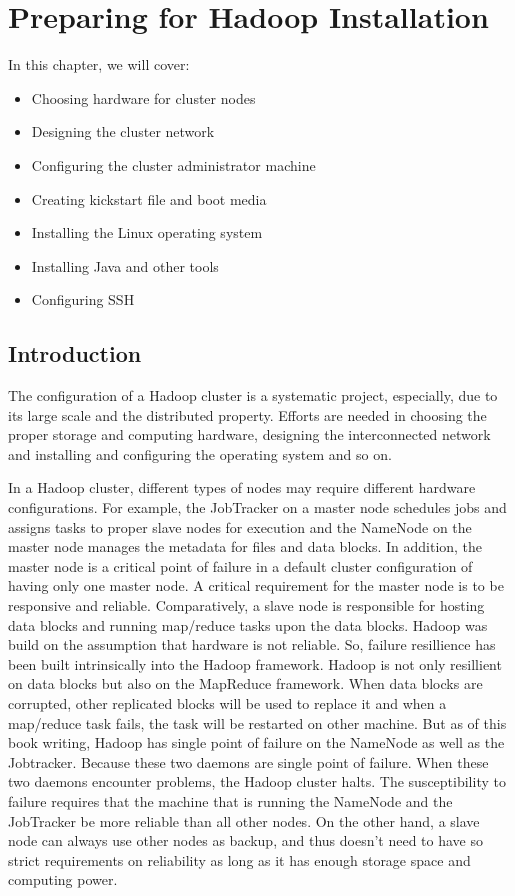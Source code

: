 \chapter{Preparing for Hadoop Installation}\label{chap:2}
In this chapter, we will cover:
\begin{itemize}
  \item Choosing hardware for cluster nodes
  \item Designing the cluster network
  \item Configuring the cluster administrator machine
  \item Creating kickstart file and boot media
  \item Installing the Linux operating system
  \item Installing Java and other tools
  \item Configuring SSH
\end{itemize}
\section{Introduction}
The configuration of a Hadoop cluster is a systematic project, especially, due to its large scale and the distributed property. Efforts are needed in choosing the proper storage and computing hardware, designing the interconnected network and installing and configuring the operating system and so on.

In a Hadoop cluster, different types of nodes may require different hardware configurations. For example, the JobTracker on a master node schedules jobs and assigns tasks to proper slave nodes for execution and the NameNode on the master node manages the metadata for files and data blocks. In addition, the master node is a critical point of failure in a default cluster configuration of having only one master node. A critical requirement for the master node is to be responsive and reliable. Comparatively, a slave node is responsible for hosting data blocks and running map/reduce tasks upon the data blocks. Hadoop was build on the assumption that hardware is not reliable. So, failure resillience has been built intrinsically into the Hadoop framework. Hadoop is not only resillient on data blocks but also on the MapReduce framework. When data blocks are corrupted, other replicated blocks will be used to replace it and when a map/reduce task fails, the task will be restarted on other machine. But as of this book writing, Hadoop has single point of failure on the NameNode as well as the Jobtracker. Because these two daemons are single point of failure. When these two daemons encounter problems, the Hadoop cluster halts. The susceptibility to failure requires that the machine that is running the NameNode and the JobTracker be more reliable than all other nodes. On the other hand, a slave node can always use other nodes as backup, and thus doesn't need to have so strict requirements on reliability as long as it has enough storage space and computing power.

